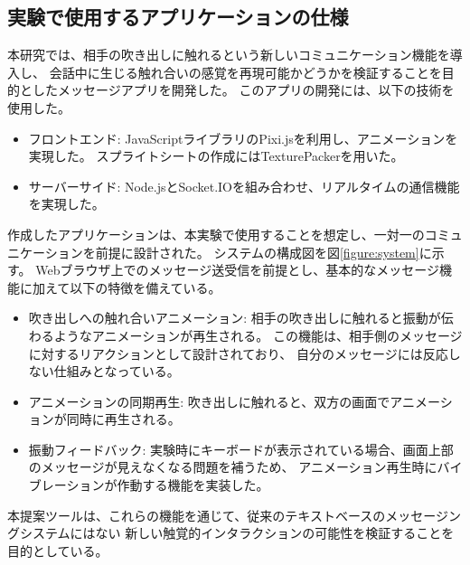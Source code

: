 \documentclass[11pt,a4paper]{ltjsreport}
\begin{document}

\subsection{実験で使用するアプリケーションの仕様}
本研究では、相手の吹き出しに触れるという新しいコミュニケーション機能を導入し、
会話中に生じる触れ合いの感覚を再現可能かどうかを検証することを目的としたメッセージアプリを開発した。
このアプリの開発には、以下の技術を使用した。

\begin{itemize}
    \item フロントエンド: JavaScriptライブラリのPixi.jsを利用し、アニメーションを実現した。
    スプライトシートの作成にはTexturePackerを用いた。
    \item サーバーサイド: Node.jsとSocket.IOを組み合わせ、リアルタイムの通信機能を実現した。
\end{itemize}

作成したアプリケーションは、本実験で使用することを想定し、一対一のコミュニケーションを前提に設計された。
システムの構成図を図\ref{figure:system}に示す。
Webブラウザ上でのメッセージ送受信を前提とし、基本的なメッセージ機能に加えて以下の特徴を備えている。

\begin{itemize}
    \item 吹き出しへの触れ合いアニメーション:
    相手の吹き出しに触れると振動が伝わるようなアニメーションが再生される。
    この機能は、相手側のメッセージに対するリアクションとして設計されており、
    自分のメッセージには反応しない仕組みとなっている。
    \item アニメーションの同期再生:
    吹き出しに触れると、双方の画面でアニメーションが同時に再生される。
    \item 振動フィードバック:
    実験時にキーボードが表示されている場合、画面上部のメッセージが見えなくなる問題を補うため、
    アニメーション再生時にバイブレーションが作動する機能を実装した。
\end{itemize}

本提案ツールは、これらの機能を通じて、従来のテキストベースのメッセージングシステムにはない
新しい触覚的インタラクションの可能性を検証することを目的としている。
\end{document}
